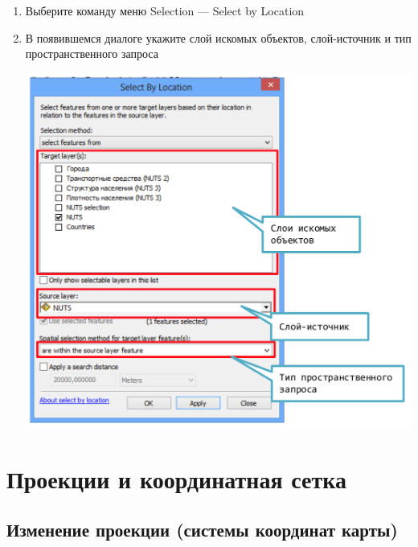 \documentclass[]{book}
\theoremstyle{definition}
\theoremstyle{definition}
\theoremstyle{definition}
\theoremstyle{remark}
\begin{document}
\begin{enumerate}
\def\labelenumi{\arabic{enumi}.}
\item
  Выберите команду меню Selection --- Select by Location
\item
  В появившемся диалоге укажите слой искомых объектов, слой-источник и
  тип пространственного запроса

  \includegraphics{images/Appendix/image74.png}
\end{enumerate}

\hypertarget{manual-projections}{%
\chapter{Проекции и координатная сетка}\label{manual-projections}}

\hypertarget{----}{%
\section{Изменение проекции (системы координат карты)}\label{----}}
\end{document}

